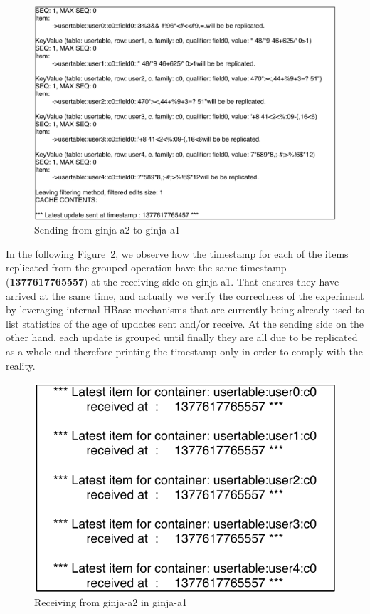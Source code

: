 
\begin{figure}
\centering
\includegraphics[scale=0.6]{figs/ginja2-grouping-send.pdf}
\caption{Sending from ginja-a2 to ginja-a1}
\label{fig-shipping-grouping}
\end{figure}

In the following Figure~\ref{fig-receiving-grouping}, we observe how the timestamp for each of the items replicated from the grouped operation have the same timestamp (\textbf{1377617765557}) at the receiving side on ginja-a1. That ensures they have arrived at the same time, and actually we verify the correctness of the experiment by leveraging internal HBase mechanisms that are currently being already used to list statistics of the age of updates sent and/or receive. At the sending side on the other hand, each update is grouped until finally they are all due to be replicated as a whole and therefore printing the timestamp only in order to comply with the reality.

\begin{figure}
\centering
\includegraphics[scale=.6]{figs/ginja1-grouping-receive.pdf}
\caption{Receiving from ginja-a2 in ginja-a1}
\label{fig-receiving-grouping}
\end{figure}
